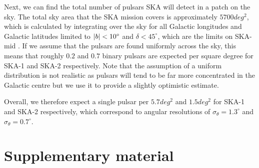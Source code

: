 Next, we can find the total number of pulsars SKA will detect in a patch on the sky. The total sky area that the SKA mission covers is approximately $5700 \unit{deg^2}$, which is calculated by integrating over the sky for all Galactic longitudes and Galactic latitudes limited to $\abs{b} < 10^\circ$ and $\delta < 45^\circ$, which are the limits on SKA-mid \citep{Keane+2015}. If we assume that the pulsars are found uniformly across the sky, this means that roughly $0.2$ and $0.7$ binary pulsars are expected per square degree for SKA-1 and SKA-2 respectively. Note that the assumption of a uniform distribution is not realistic as pulsars will tend to be far more concentrated in the Galactic centre but we use it to provide a slightly optimistic estimate.

Overall, we therefore expect a single pulsar per $5.7 \unit{deg^2}$ and $1.5 \unit{deg^2}$ for SKA-1 and SKA-2 respectively, which correspond to angular resolutions of $\sigma_\theta = 1.3^\circ$ and $\sigma_\theta = 0.7^\circ$.

\clearpage
\onecolumngrid

\section{Supplementary material}

